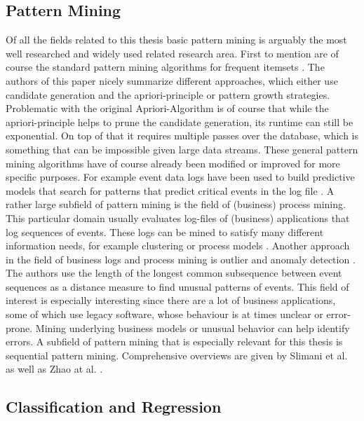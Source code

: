 \subsection{Pattern Mining}
\label{subsec_patternMining}
Of all the fields related to this thesis basic pattern mining is arguably the most well researched and widely used related research area. First to mention are of course the standard pattern mining algorithms for frequent itemsets \cite{han2007frequent}. The authors of this paper nicely summarize different approaches, which either use candidate generation and the apriori-principle or pattern growth strategies. Problematic with the original Apriori-Algorithm is of course that while the apriori-principle helps to prune the candidate generation, its runtime can still be exponential. On top of that it requires multiple passes over the database, which is something that can be impossible given large data streams. These general pattern mining algorithms have of course already been modified or improved for more specific purposes. For example event data logs have been used to build predictive models that search for patterns that predict critical events in the log file \cite{chen2014pattern}. \newline
A rather large subfield of pattern mining is the field of (business) process mining. This particular domain usually evaluates log-files of (business) applications that log sequences of events. These logs can be mined to satisfy many different information needs, for example clustering \cite{vaarandi2015logcluster} or process models \cite{priyadharshini2016analysis}.
Another approach in the field of business logs and process mining is outlier and anomaly detection \cite{sureka2015kernel}. The authors use the length of the longest common subsequence between event sequences as a distance measure to find unusual patterns of events. This field of interest is especially interesting since there are a lot of business applications, some of which use legacy software, whose behaviour is at times unclear or error-prone. Mining underlying business models or unusual behavior can help identify errors. \newline
A subfield of pattern mining that is especially relevant for this thesis is sequential pattern mining. Comprehensive overviews are given by Slimani et al. \cite{slimani2013sequential} as well as Zhao at al. \cite{zhao2003sequential}.

\subsection{Classification and Regression}
\label{subsec_regression}

